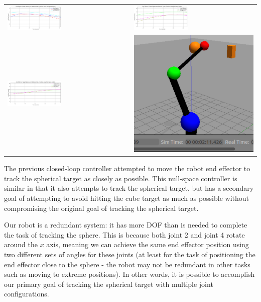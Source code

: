 \documentclass[11pt]{article}
\begin{document}
\begin{center}
    \begin{tabular}{ll}
        \includegraphics[width=0.45\textwidth]{images/nullspace_x.png}
        &
        \includegraphics[width=0.45\textwidth]{images/nullspace_y.png} \\
        \includegraphics[width=0.45\textwidth]{images/nullspace_z.png} & \includegraphics[height=0.19\textwidth]{images/nullspace_pic.png}
    \end{tabular}
\end{center}

The previous closed-loop controller attempted to move the robot end effector to track the spherical target as closely as possible. This null-space controller is similar in that it also attempts to track the spherical target, but has a secondary goal of attempting to avoid hitting the cube target as much as possible without compromising the original goal of tracking the spherical target.

Our robot is a redundant system: it has more DOF than is needed to complete the task of tracking the sphere. This is because both joint 2 and joint 4 rotate around the \(x\) axis, meaning we can achieve the same end effector position using two different sets of angles for these joints (at least for the task of positioning the end effector close to the sphere - the robot may not be redundant in other tasks such as moving to extreme positions). In other words, it is possible to accomplish our primary goal of tracking the spherical target with multiple joint configurations.
\end{document}
